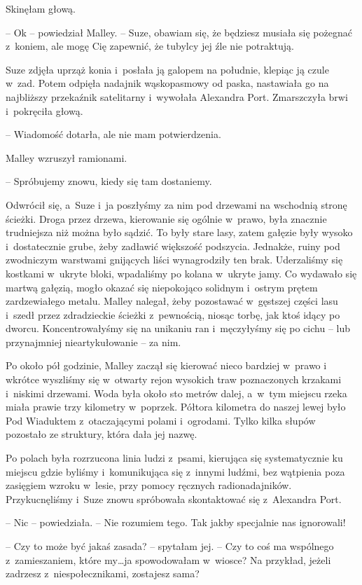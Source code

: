 \documentclass[oneside,polish,11pt,sfheadings]{mwbk}
\begin{document}
Skinęłam głową.

-- Ok -- powiedział Malley. -- Suze, obawiam się, że będziesz musiała się
pożegnać z~koniem, ale mogę Cię zapewnić, że tubylcy jej źle nie
potraktują.

Suze zdjęła uprząż konia i~posłała ją galopem na południe, klepiąc ją
czule w~zad. Potem odpięła nadajnik wąskopasmowy od paska, nastawiała go
na najbliższy przekaźnik satelitarny i~wywołała Alexandra Port.
Zmarszczyła brwi i~pokręciła głową.

-- Wiadomość dotarła, ale nie mam potwierdzenia.

Malley wzruszył ramionami. 

-- Spróbujemy znowu, kiedy się tam dostaniemy.

Odwrócił się, a~Suze i~ja poszłyśmy za nim pod drzewami na wschodnią
stronę ścieżki. Droga przez drzewa, kierowanie się ogólnie w~prawo, była
znacznie trudniejsza niż można było sądzić. To były stare lasy, zatem
gałęzie były wysoko i~dostatecznie grube, żeby zadławić większość
podszycia. Jednakże, ruiny pod zwodniczym warstwami gnijących liści
wynagrodziły ten brak. Uderzaliśmy się kostkami w~ukryte bloki,
wpadaliśmy po kolana w~ukryte jamy. Co wydawało się martwą gałęzią,
mogło okazać się niepokojąco solidnym i~ostrym prętem zardzewiałego
metalu. Malley nalegał, żeby pozostawać w~gęstszej części lasu i~szedł
przez zdradzieckie ścieżki z~pewnością, niosąc torbę, jak ktoś idący po
dworcu. Koncentrowałyśmy się na unikaniu ran i~męczyłyśmy się po cichu -- lub przynajmniej nieartykułowanie -- za nim.

Po około pół godzinie, Malley zaczął się kierować nieco bardziej w~prawo
i wkrótce wyszliśmy się w~otwarty rejon wysokich traw poznaczonych
krzakami i~niskimi drzewami. Woda była około sto metrów dalej, a~w~tym
miejscu rzeka miała prawie trzy kilometry w~poprzek. Półtora kilometra
do naszej lewej było Pod Wiaduktem z~otaczającymi polami i~ogrodami.
Tylko kilka słupów pozostało ze struktury, która dała jej nazwę.

Po polach była rozrzucona linia ludzi z~psami, kierująca się
systematycznie ku miejscu gdzie byliśmy i~komunikująca się z~innymi
ludźmi, bez wątpienia poza zasięgiem wzroku w~lesie, przy pomocy
ręcznych radionadajników. Przykucnęliśmy i~Suze znowu spróbowała
skontaktować się z~Alexandra Port.

-- Nic -- powiedziała. -- Nie rozumiem tego. Tak jakby specjalnie nas
ignorowali!

-- Czy to może być jakaś zasada? -- spytałam jej. -- Czy to coś ma
wspólnego z~zamieszaniem, które my\ldots  ja spowodowałam w~wiosce? Na
przykład, jeżeli zadrzesz z~niespołecznikami, zostajesz sama?
\end{document}
